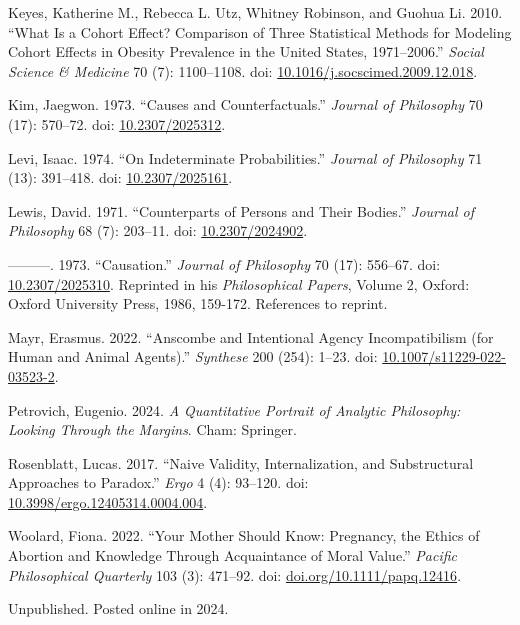 \documentclass[
  11pt,
  letterpaper,
  DIV=11,
  numbers=noendperiod,
  twoside]{scrartcl}
\newlength{\cslhangindent}
\newenvironment{CSLReferences}[2] %
 {\begin{list}{}{%
  \setlength{\itemindent}{0pt}
  \setlength{\leftmargin}{0pt}
  \setlength{\parsep}{0pt}
  \ifodd #1
   \setlength{\leftmargin}{\cslhangindent}
   \setlength{\itemindent}{-1\cslhangindent}
  \fi
  \setlength{\itemsep}{#2\baselineskip}}}
 {\end{list}}
\begin{document}
\begin{CSLReferences}{1}{0}
Keyes, Katherine M., Rebecca L. Utz, Whitney Robinson, and Guohua Li.
2010. {``What Is a Cohort Effect? Comparison of Three Statistical
Methods for Modeling Cohort Effects in Obesity Prevalence in the United
States, 1971--2006.''} \emph{Social Science \& Medicine} 70 (7):
1100--1108. doi:
\href{https://doi.org/10.1016/j.socscimed.2009.12.018}{10.1016/j.socscimed.2009.12.018}.

Kim, Jaegwon. 1973. {``Causes and Counterfactuals.''} \emph{Journal of
Philosophy} 70 (17): 570--72. doi:
\href{https://doi.org/10.2307/2025312}{10.2307/2025312}.

Levi, Isaac. 1974. {``On Indeterminate Probabilities.''} \emph{Journal
of Philosophy} 71 (13): 391--418. doi:
\href{https://doi.org/10.2307/2025161}{10.2307/2025161}.

Lewis, David. 1971. {``Counterparts of Persons and Their Bodies.''}
\emph{Journal of Philosophy} 68 (7): 203--11. doi:
\href{https://doi.org/10.2307/2024902}{10.2307/2024902}.

---------. 1973. {``Causation.''} \emph{Journal of Philosophy} 70 (17):
556--67. doi: \href{https://doi.org/10.2307/2025310}{10.2307/2025310}.
Reprinted in his \emph{Philosophical Papers}, Volume 2, Oxford: Oxford
University Press, 1986, 159-172. References to reprint.

Mayr, Erasmus. 2022. {``Anscombe and Intentional Agency Incompatibilism
(for Human and Animal Agents).''} \emph{Synthese} 200 (254): 1--23. doi:
\href{https://doi.org/10.1007/s11229-022-03523-2}{10.1007/s11229-022-03523-2}.

Petrovich, Eugenio. 2024. \emph{A Quantitative Portrait of Analytic
Philosophy: Looking Through the Margins}. Cham: Springer.

Rosenblatt, Lucas. 2017. {``Naive Validity, Internalization, and
Substructural Approaches to Paradox.''} \emph{Ergo} 4 (4): 93--120. doi:
\href{https://doi.org/10.3998/ergo.12405314.0004.004}{10.3998/ergo.12405314.0004.004}.

Woolard, Fiona. 2022. {``Your Mother Should Know: Pregnancy, the Ethics
of Abortion and Knowledge Through Acquaintance of Moral Value.''}
\emph{Pacific Philosophical Quarterly} 103 (3): 471--92. doi:
\href{https://doi.org/doi.org/10.1111/papq.12416}{doi.org/10.1111/papq.12416}.

\end{CSLReferences}



\noindent Unpublished. Posted online in 2024.
\end{document}
